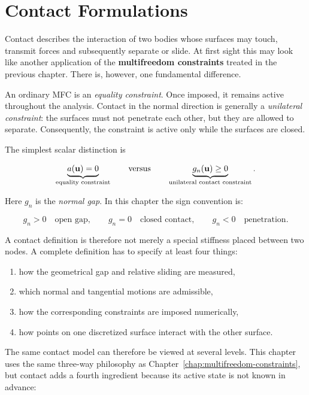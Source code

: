 \newpage
\chapter{Contact Formulations}\label{chap:contact-formulations}

Contact describes the interaction of two bodies whose surfaces may touch,
transmit forces and subsequently separate or slide. At first sight this may
look like another application of the \textbf{multifreedom constraints} treated
in the previous chapter. There is, however, one fundamental difference.

An ordinary MFC is an \textit{equality constraint}. Once imposed, it remains
active throughout the analysis. Contact in the normal direction is generally a
\textit{unilateral constraint}: the surfaces must not penetrate each other, but
they are allowed to separate. Consequently, the constraint is active only while
the surfaces are closed.

The simplest scalar distinction is

\begin{equation}
    \underbrace{a(\mathbf{u}) = 0}_{\text{equality constraint}}
    \qquad \text{versus} \qquad
    \underbrace{g_n(\mathbf{u}) \geq 0}_{\text{unilateral contact constraint}}.
\end{equation}

Here $ g_n $ is the \textit{normal gap}. In this chapter the sign convention is:

\begin{equation}
    g_n > 0 \quad \text{open gap}, \qquad
    g_n = 0 \quad \text{closed contact}, \qquad
    g_n < 0 \quad \text{penetration}.
\end{equation}

A contact definition is therefore not merely a special stiffness placed between
two nodes. A complete definition has to specify at least four things:

\begin{enumerate}
    \item how the geometrical gap and relative sliding are measured,
    \item which normal and tangential motions are admissible,
    \item how the corresponding constraints are imposed numerically,
    \item how points on one discretized surface interact with the other surface.
\end{enumerate}


The same contact model can therefore be viewed at several levels. This chapter
uses the same three-way philosophy as Chapter~\ref{chap:multifreedom-constraints},
but contact adds a fourth ingredient because its active state is not known in
advance:

